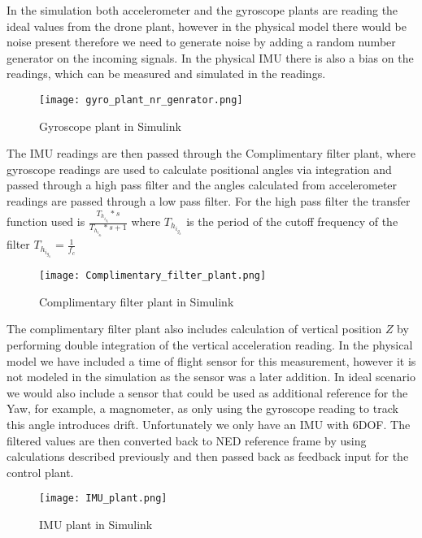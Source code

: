 \begin{flushleft}
In the simulation both accelerometer and the gyroscope plants are reading the ideal values from the drone plant, however in the physical model there would be noise present therefore we need to generate noise by adding a random number generator on the incoming signals. In the physical IMU there is also a bias on the readings, which can be measured and simulated in the readings.

\begin{figure}[H]
    \begin{center}
    \texttt{[image: gyro\_plant\_nr\_genrator.png]}
    \end{center}
    \caption{Gyroscope plant in Simulink}
    \label{fig:my_label}
\end{figure}

The IMU readings are then passed through the Complimentary filter plant, where gyroscope readings are used to calculate positional angles via integration and passed through a high pass filter and the angles calculated from accelerometer readings are passed through a low pass filter. For the high pass filter the transfer function used is $\frac{T_h_i_g_h*s}{T_h_i_g_h*s+1}$ where $T_h_i_g_h$ is the period of the cutoff frequency of the filter $T_h_i_g_h=\frac{1}{f_c}$

\begin{figure}[H]
    \begin{center}
    \texttt{[image: Complimentary\_filter\_plant.png]}
    \end{center}
    \caption{Complimentary filter plant in Simulink}
    \label{fig:my_label}
\end{figure}

The complimentary filter plant also includes calculation of vertical position $Z$ by performing double integration of the vertical acceleration reading. In the physical model we have included a time of flight sensor for this measurement, however it is not modeled in the simulation as the sensor was a later addition. In ideal scenario we would also include a sensor that could be used as additional reference for the Yaw, for example, a magnometer, as only using the gyroscope reading to track this angle introduces drift. Unfortunately we only have an IMU with 6DOF. 
The filtered values are then converted back to NED reference frame by using calculations described previously and then passed back as feedback input for the control plant.

\begin{figure}[H]
    \begin{center}
    \texttt{[image: IMU\_plant.png]}
    \end{center}
    \caption{IMU plant in Simulink}
    \label{fig:my_label}
\end{figure}

\end{flushleft}

